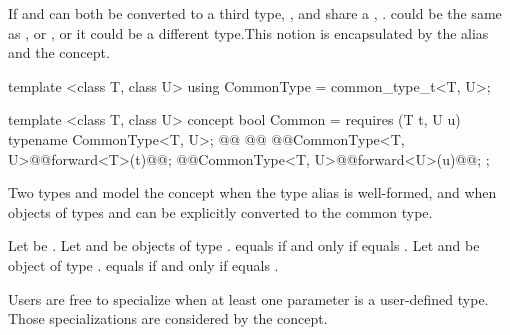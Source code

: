 \begin{addedblock}

\pnum
If  and  can both be  converted to a third type,
,  and  share a ,
. \enternote {} could be the same as , or , or
it could be a different type.\exitnote This notion is encapsulated by the
 alias and the  concept.

%
\begin{itemdecl}
template <class T, class U>
using CommonType = common_type_t<T, U>;

template <class T, class U>
concept bool Common =
  requires (T t, U u) {
    typename CommonType<T, U>;
    @@
    @@
    @\oldtxt{\{}@CommonType<T, U>@\oldtxt{\{}\newtxt{(}@forward<T>(t)@\newtxt{)}\oldtxt{\}\}}@;
    @\oldtxt{\{}@CommonType<T, U>@\oldtxt{\{}\newtxt{(}@forward<U>(u)@\newtxt{)}\oldtxt{\}\}}@;
  };
\end{itemdecl}

\begin{itemdescr}
\pnum
Two types  and  model the  concept when the type
alias  is well-formed, and when objects of types 
and  can be explicitly converted to the common type.

\pnum
Let  be . Let  and  be objects
of type .  equals  if and only if
 equals
. Let  and  be
object of type .  equals  if and only if
 equals
.

\pnum
\enternote Users are free to specialize  when at least one parameter is a
user-defined type. Those specializations are considered by the  concept.\exitnote


\end{itemdescr}
\end{addedblock}
